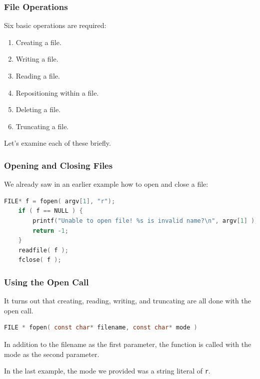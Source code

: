 \begin{frame}
\frametitle{File Operations}
Six basic operations are required:

\begin{enumerate}
	\item Creating a file.
	\item Writing a file.
	\item Reading a file.
	\item Repositioning within a file.
	\item Deleting a file.
	\item Truncating a file.
\end{enumerate}

Let's examine each of these briefly.

\end{frame}


\begin{frame}[fragile]
\frametitle{Opening and Closing Files}
We already saw in an earlier example how to open and close a file:
\begin{lstlisting}[language=C]
    FILE* f = fopen( argv[1], "r");
    if ( f == NULL ) {
        printf("Unable to open file! %s is invalid name?\n", argv[1] );
        return -1;
    }
    readfile( f );
    fclose( f );
\end{lstlisting}
\end{frame}



\begin{frame}[fragile]
\frametitle{Using the Open Call}

It turns out that creating, reading, writing, and truncating are all done with the open call. 

\begin{lstlisting}[language=C]
FILE * fopen( const char* filename, const char* mode )
\end{lstlisting}

In addition to the filename as the first parameter, the function is called with the mode as the second parameter. 

In the last example, the mode we provided was a string literal of \texttt{r}. 

\end{frame}


